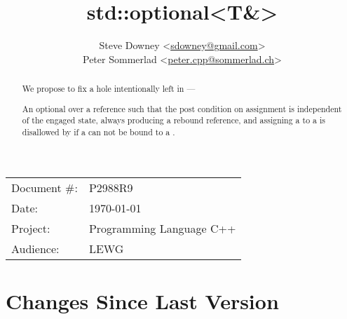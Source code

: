 \documentclass[a4paper,10pt,oneside,openany,final,article]{memoir}
\begin{document}
\title{std::optional<T\&>}
\author{
  Steve Downey \small<\href{mailto:sdowney@gmail.com}{sdowney@gmail.com}> \\
  Peter Sommerlad \small<\href{mailto:peter.cpp@sommerlad.ch}{peter.cpp@sommerlad.ch}> \\
}
\date{} %
\maketitle

\begin{flushright}
  \begin{tabular}{ll}
    Document \#: & P2988R9 \\
    Date: & \today \\
    Project: & Programming Language C++ \\
    Audience: & LEWG
  \end{tabular}
\end{flushright}

\begin{abstract}
  We propose to fix a hole intentionally left in  ---

  An optional over a reference such that the post condition on assignment is independent of the engaged state, always producing a rebound reference, and assigning a  to a  is disallowed by  if a  can not be bound to a .
\end{abstract}

\tableofcontents*

\chapter*{Changes Since Last Version}
\end{document}
